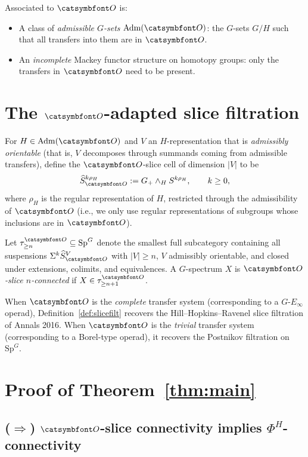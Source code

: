 Associated to $\aO$ is:
\begin{itemize}
\item A class of \emph{admissible $G$-sets} $\mathrm{Adm}(\aO)$: the $G$-sets $G/H$ such that all transfers into them are in $\aO$.
\item An \emph{incomplete} Mackey functor structure on homotopy groups: only the transfers in $\aO$ need to be present.
\end{itemize}

\section{The $\aO$-adapted slice filtration}

\begin{definition}
For $H\in\mathrm{Adm}(\aO)$ and $V$ an $H$-representation that is \emph{admissibly orientable} (that is, $V$ decomposes through summands coming from admissible transfers), define the $\aO$-slice cell of dimension $|V|$ to be
\[
   \widehat S^{k\rho_H}_\aO := G_+\wedge_H S^{k\rho_H},\qquad k\geq 0,
\]
where $\rho_H$ is the regular representation of $H$, restricted through the admissibility of $\aO$ (i.e., we only use regular representations of subgroups whose inclusions are in $\aO$).
\end{definition}

\begin{definition}\label{def:slicefilt}
Let $\tau^\aO_{\geq n}\subseteq \mathrm{Sp}^G$ denote the smallest full subcategory containing all suspensions $\Sigma^k \widehat S^{V}_\aO$ with $|V|\geq n$, $V$ admissibly orientable, and closed under extensions, colimits, and equivalences. A $G$-spectrum $X$ is \emph{$\aO$-slice $n$-connected} if $X\in\tau^\aO_{\geq n+1}$.
\end{definition}

When $\aO$ is the \emph{complete} transfer system (corresponding to a $G$-$E_\infty$ operad), Definition~\ref{def:slicefilt} recovers the Hill--Hopkins--Ravenel slice filtration of Annals 2016. When $\aO$ is the \emph{trivial} transfer system (corresponding to a Borel-type operad), it recovers the Postnikov filtration on $\mathrm{Sp}^G$.

\section{Proof of Theorem~\ref{thm:main}}

\subsection{($\Rightarrow$) $\aO$-slice connectivity implies $\Phi^H$-connectivity}

